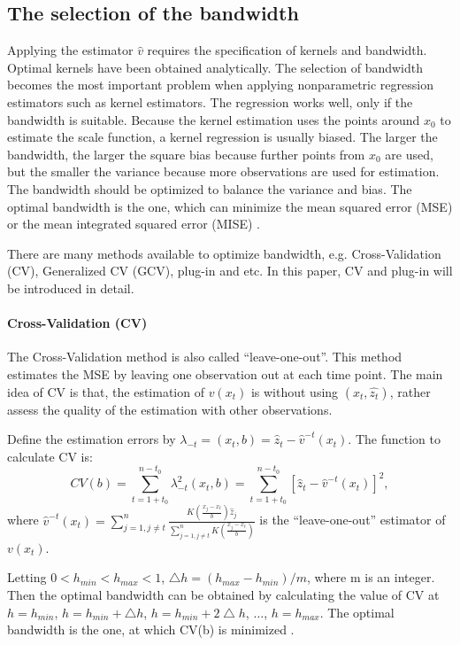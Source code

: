 \subsection{The selection of the bandwidth}
Applying the estimator $\hat{v}$ requires the specification of kernels and bandwidth. Optimal kernels have been obtained analytically. The selection of bandwidth becomes the most important problem when applying nonparametric regression estimators such as kernel estimators. The regression works well, only if the bandwidth is suitable. Because the kernel estimation uses the points around $x_{0}$ to estimate the scale function, a kernel regression is usually biased. The larger the bandwidth, the larger the square bias because further points from $x_{0}$ are used, but the smaller the variance because more observations are used for estimation. The bandwidth should be optimized to balance the variance and bias. The optimal bandwidth is the one, which can minimize the mean squared error (MSE) or the mean integrated squared error (MISE) \citep{Gasser1991}. 

There are many methods available to optimize bandwidth, e.g. Cross-Validation (CV), Generalized CV (GCV), plug-in and etc. In this paper, CV and plug-in will be introduced in detail.

\paragraph{Cross-Validation (CV)}

The Cross-Validation method is also called ``leave-one-out''. This method estimates the MSE by leaving one observation out at each time point. The main idea of CV is that, the estimation of $v(x_{t})$ is without using $(x_{t},\hat{z_{t}})$, rather assess the quality of the estimation with other observations. 

Define the estimation errors by $\lambda_{-t}=(x_{t},b)=\hat{z}_t-\hat{v}^{-t}(x_{t})$. The function to calculate CV is:
\begin{equation}
CV(b) = \sum_{t=1+t_{0}}^{n-t_{0}}\lambda_{-t}^{2}(x_{t},b)=\sum_{t=1+t_{0}}^{n-t_{0}}[\hat{z}_{t}-\hat{v}^{-t}(x_{t})]^{2},
\end{equation}
where $\hat{v}^{-t}(x_t)=\sum_{j=1,j\neq t}^{n}\frac{K(\frac{x_{j}-x_{t}}{b})\hat{z}_{j}}{\sum_{j=1,j \neq t}^{n}K(\frac{x_{j}-x_{t}}{b})}$ is the ``leave-one-out'' estimator of $v(x_{t})$.

Letting $0<h_{min}<h_{max}<1$, $\bigtriangleup h=(h_{max}-h_{min})/m$, where m is an integer. Then the optimal bandwidth can be obtained by calculating the value of CV at $h=h_{min}$, $h=h_{min} + \bigtriangleup h$, $h=h_{min} + 2\bigtriangleup h$, $\ldots$, $ h=h_{max}$. The optimal bandwidth is the one, at which CV(b) is minimized \citep{Sarda1993}.

